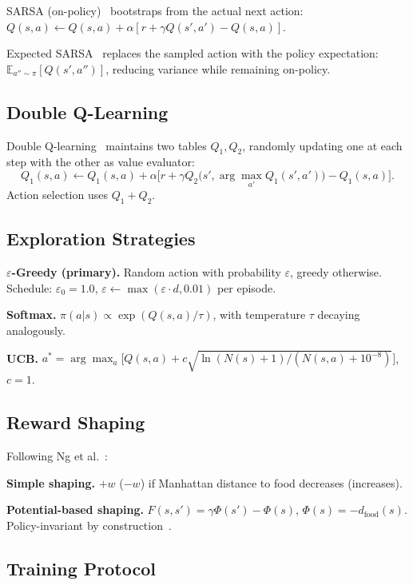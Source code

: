 \documentclass[10pt,conference]{IEEEtran}
\begin{document}
SARSA (on-policy)~\cite{rummery1994line} bootstraps from the
actual next action:
$Q(s,a)\leftarrow Q(s,a)+\alpha[r+\gamma Q(s',a')-Q(s,a)]$.

Expected SARSA~\cite{sutton2018reinforcement} replaces the sampled
action with the policy expectation:
$\mathbb{E}_{a''\sim\pi}[Q(s',a'')]$,
reducing variance while remaining on-policy.

\subsection{Double Q-Learning}

Double Q-learning~\cite{hasselt2010double} maintains two tables
$Q_1,Q_2$, randomly updating one at each step with the other as
value evaluator:
\begin{equation}
  Q_1(s,a)\leftarrow Q_1(s,a)+\alpha\bigl[
    r+\gamma Q_2\!\bigl(s',\arg\max_{a'}Q_1(s',a')\bigr)-Q_1(s,a)\bigr].
\end{equation}
Action selection uses $Q_1+Q_2$.

\subsection{Exploration Strategies}

\textbf{$\varepsilon$-Greedy (primary).}
Random action with probability $\varepsilon$, greedy otherwise.
Schedule: $\varepsilon_0=1.0$, $\varepsilon\leftarrow
\max(\varepsilon\cdot d,0.01)$ per episode.

\textbf{Softmax.}
$\pi(a|s)\propto\exp(Q(s,a)/\tau)$, with temperature $\tau$
decaying analogously.

\textbf{UCB.}
$a^*=\arg\max_a\bigl[Q(s,a)+c\sqrt{\ln(N(s)+1)/(N(s,a)+10^{-8})}\bigr]$,
$c=1$.

\subsection{Reward Shaping}

Following Ng et al.~\cite{ng1999policy}:

\textbf{Simple shaping.}
$+w$ ($-w$) if Manhattan distance to food decreases (increases).

\textbf{Potential-based shaping.}
$F(s,s')=\gamma\Phi(s')-\Phi(s)$, $\Phi(s)=-d_{\text{food}}(s)$.
Policy-invariant by construction~\cite{ng1999policy}.

\subsection{Training Protocol}
\end{document}
